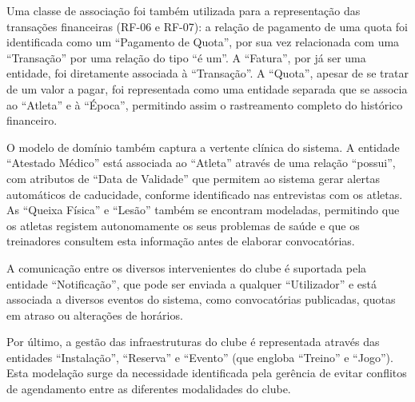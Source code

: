 Uma classe de associação foi também utilizada para a representação das transações financeiras (RF-06 e RF-07): a relação de pagamento de uma quota foi identificada como um ``Pagamento de Quota'', por sua vez relacionada com uma ``Transação'' por uma relação do tipo ``é um''. A ``Fatura'', por já ser uma entidade, foi diretamente associada à ``Transação''. A ``Quota'', apesar de se tratar de um valor a pagar, foi representada como uma entidade separada que se associa ao ``Atleta'' e à ``Época'', permitindo assim o rastreamento completo do histórico financeiro.

O modelo de domínio também captura a vertente clínica do sistema. A entidade ``Atestado Médico'' está associada ao ``Atleta'' através de uma relação ``possui'', com atributos de ``Data de Validade'' que permitem ao sistema gerar alertas automáticos de caducidade, conforme identificado nas entrevistas com os atletas. As ``Queixa Física'' e ``Lesão'' também se encontram modeladas, permitindo que os atletas registem autonomamente os seus problemas de saúde e que os treinadores consultem esta informação antes de elaborar convocatórias.

A comunicação entre os diversos intervenientes do clube é suportada pela entidade ``Notificação'', que pode ser enviada a qualquer ``Utilizador'' e está associada a diversos eventos do sistema, como convocatórias publicadas, quotas em atraso ou alterações de horários.

Por último, a gestão das infraestruturas do clube é representada através das entidades ``Instalação'', ``Reserva'' e ``Evento'' (que engloba ``Treino'' e ``Jogo''). Esta modelação surge da necessidade identificada pela gerência de evitar conflitos de agendamento entre as diferentes modalidades do clube.

